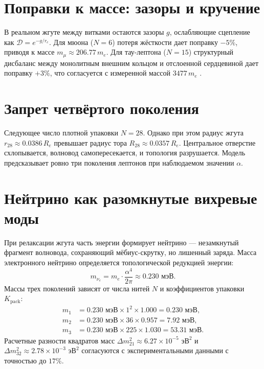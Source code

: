 \documentclass[12pt,a4paper]{article}
\begin{document}
\section{Поправки к массе: зазоры и кручение}

В реальном жгуте между витками остаются зазоры $g$, ослабляющие сцепление как $\mathcal{D} = e^{-g / r_e}$. Для мюона ($N=6$) потеря жёсткости дает поправку $-5\%$, приводя к массе $m_\mu \approx 206.77\,m_e$. Для тау-лептона ($N=15$) структурный дисбаланс между монолитным внешним кольцом и отслоенной сердцевиной дает поправку $+3\%$, что согласуется с измеренной массой $3477\,m_e$ \cite{pdg2024}.

\section{Запрет четвёртого поколения}

Следующее число плотной упаковки $N=28$. Однако при этом радиус жгута $r_{28} \approx 0.0386\,R_e$ превышает радиус тора $R_{28} \approx 0.0357\,R_e$. Центральное отверстие схлопывается, волновод самопересекается, и топология разрушается. Модель предсказывает ровно три поколения лептонов при наблюдаемом значении $\alpha$.

\section{Нейтрино как разомкнутые вихревые моды}

При релаксации жгута часть энергии формирует нейтрино — незамкнутый фрагмент волновода, сохраняющий мёбиус-скрутку, но лишенный заряда. Масса электронного нейтрино определяется топологической редукцией энергии:
\begin{equation}
m_{\nu_e} = m_e \cdot \frac{\alpha^4}{2\pi} \approx 0.230 \text{ мэВ}.
\end{equation}
Массы трех поколений зависят от числа нитей $N$ и коэффициентов упаковки $K_{\text{pack}}$:
\begin{align}
m_1 &= 0.230 \text{ мэВ} \times 1^2 \times 1.000 = 0.230 \text{ мэВ}, \\
m_2 &= 0.230 \text{ мэВ} \times 36 \times 0.957 = 7.92 \text{ мэВ}, \\
m_3 &= 0.230 \text{ мэВ} \times 225 \times 1.030 = 53.31 \text{ мэВ}.
\end{align}
Расчетные разности квадратов масс $\Delta m^2_{21} \approx 6.27 \times 10^{-5} \text{ эВ}^2$ и $\Delta m^2_{32} \approx 2.78 \times 10^{-3} \text{ эВ}^2$ согласуются с экспериментальными данными \cite{pdg2024} с точностью до $17\%$.
\end{document}
